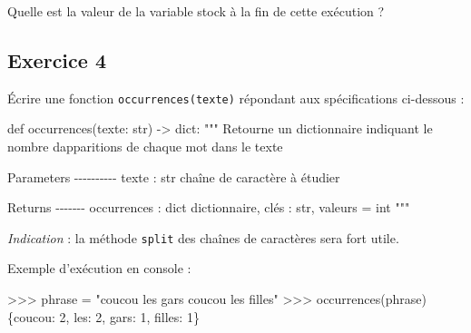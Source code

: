 \documentclass[
  letterpaper,
  DIV=11,
  numbers=noendperiod]{scrartcl}
\newenvironment{Shaded}{\begin{snugshade}}{\end{snugshade}}
\newcommand{\BuiltInTok}[1]{\textcolor[rgb]{0.00,0.23,0.31}{#1}}
\newcommand{\CommentTok}[1]{\textcolor[rgb]{0.37,0.37,0.37}{#1}}
\newcommand{\DecValTok}[1]{\textcolor[rgb]{0.68,0.00,0.00}{#1}}
\newcommand{\KeywordTok}[1]{\textcolor[rgb]{0.00,0.23,0.31}{#1}}
\newcommand{\NormalTok}[1]{\textcolor[rgb]{0.00,0.23,0.31}{#1}}
\newcommand{\OperatorTok}[1]{\textcolor[rgb]{0.37,0.37,0.37}{#1}}
\newcommand{\StringTok}[1]{\textcolor[rgb]{0.13,0.47,0.30}{#1}}
\begin{document}
Quelle est la valeur de la variable stock à la fin de cette exécution ?

\hypertarget{fa-desktop-exercice-4}{%
\subsection{\texorpdfstring{ Exercice
4}{ Exercice 4}}\label{fa-desktop-exercice-4}}

Écrire une fonction \texttt{occurrences(texte)} répondant aux
spécifications ci-dessous :

\begin{Shaded}
\begin{Highlighting}[]
\KeywordTok{def}\NormalTok{ occurrences(texte: }\BuiltInTok{str}\NormalTok{) }\OperatorTok{{-}\textgreater{}} \BuiltInTok{dict}\NormalTok{:}
    \CommentTok{"""}
\CommentTok{    Retourne un dictionnaire indiquant le nombre d\textquotesingle{}apparitions de chaque mot dans le texte}

\CommentTok{    Parameters}
\CommentTok{    {-}{-}{-}{-}{-}{-}{-}{-}{-}{-}}
\CommentTok{    texte : str}
\CommentTok{        chaîne de caractère à étudier}

\CommentTok{    Returns}
\CommentTok{    {-}{-}{-}{-}{-}{-}{-}}
\CommentTok{    occurrences : dict}
\CommentTok{        dictionnaire, clés : str, valeurs = int}
\CommentTok{    """}
\end{Highlighting}
\end{Shaded}

\emph{Indication} : la méthode \texttt{split} des chaînes de caractères
sera fort utile.

Exemple d'exécution en console :

\begin{Shaded}
\begin{Highlighting}[]
\OperatorTok{\textgreater{}\textgreater{}\textgreater{}}\NormalTok{ phrase }\OperatorTok{=} \StringTok{"coucou les gars coucou les filles"}
\OperatorTok{\textgreater{}\textgreater{}\textgreater{}}\NormalTok{ occurrences(phrase)}
\NormalTok{\{}\StringTok{\textquotesingle{}coucou\textquotesingle{}}\NormalTok{: }\DecValTok{2}\NormalTok{, }\StringTok{\textquotesingle{}les\textquotesingle{}}\NormalTok{: }\DecValTok{2}\NormalTok{, }\StringTok{\textquotesingle{}gars\textquotesingle{}}\NormalTok{: }\DecValTok{1}\NormalTok{, }\StringTok{\textquotesingle{}filles\textquotesingle{}}\NormalTok{: }\DecValTok{1}\NormalTok{\}}
\end{Highlighting}
\end{Shaded}
\end{document}

